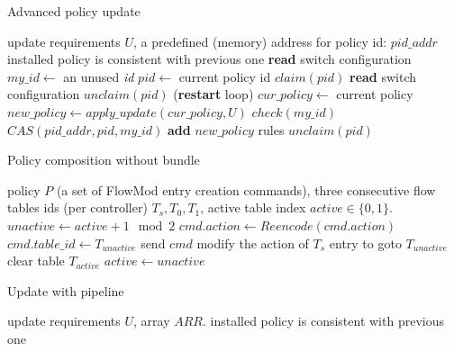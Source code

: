 \documentclass[conference]{sigcomm-alternate}
\newcommand{\claimcheck}{check\xspace}
\begin{document}
\begin{algorithm}[t]
    \caption{Advanced policy update}
    \label{alg:update}
    \begin{algorithmic}[1]
    \Require update requirements $U$, a predefined (memory) address for  policy id: $pid\_addr$
    \Ensure installed policy is consistent with previous one
 		\Repeat
 			\State \textbf{read} switch configuration
 			\State $my\_id\gets$ an unused \emph{id} 
 			\State $pid\gets$ current policy id 
 			\State $claim(pid)$
 			\State \textbf{read} switch configuration
	 			\State $unclaim(pid)$
 				 (\textbf{restart} loop)
 			\EndIf
 			\State $cur\_policy\gets$ current policy
 			\State $new\_policy\gets apply\_update(cur\_policy,U)$
 			\startTxn
 				\State $\claimcheck(my\_id)$
	 			\State $CAS(pid\_addr, pid,my\_id)$
	 			\State \textbf{add} $new\_policy$ rules %
 			\endTxn
	 		\State $unclaim(pid)$
			\Return

    \end{algorithmic}
\end{algorithm}


\begin{algorithm}[t]
    \caption{Policy composition without bundle}
    \label{alg:wobundle}
    \begin{algorithmic}[1]
    \Require policy $P$ (a set of FlowMod entry creation commands), three consecutive flow tables ids (per controller) $T_s,T_0,T_1$, active table index $active\in\{0,1\}$.
    \State $unactive \gets active + 1 \mod{2}$
	    \State $cmd.action\gets Reencode(cmd.action)$
	    \State $cmd.table\_id\gets T_{unactive}$
	    \State send $cmd$
    \EndFor
    \State modify the action of $T_s$ entry to goto $T_{unactive}$
    \State clear table $T_{active}$
    \State $active \gets unactive$
	\Return

    \end{algorithmic}
\end{algorithm}

\begin{algorithm}[t]
    \caption{Update with pipeline}
    \label{alg:pipeline}
    \begin{algorithmic}[1]
    \Require update requirements $U$, array $ARR$.
    \Ensure installed policy is consistent with previous one
			\Return

    \end{algorithmic}
\end{algorithm}
\end{document}

